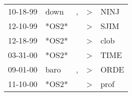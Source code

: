 \begin{supertabular}{p{0.07\textwidth}p{0.06\textwidth}p{0.02\textwidth}p{0.02\textwidth}p{0.06\textwidth}}
 10-18-99\textsuperscript{} &  down\textsuperscript{} &             , &  \textgreater &           NINJ\textsuperscript{} \\
 12-10-99\textsuperscript{} &                   *OS2* &               &  \textgreater &           SJIM\textsuperscript{} \\
 12-18-99\textsuperscript{} &                   *OS2* &               &  \textgreater &           clob\textsuperscript{} \\
 03-31-00\textsuperscript{} &                   *OS2* &               &  \textgreater &           TIME\textsuperscript{} \\
 09-01-00\textsuperscript{} &  baro\textsuperscript{} &             , &  \textgreater &           ORDE\textsuperscript{} \\
 11-10-00\textsuperscript{} &                   *OS2* &               &  \textgreater &           prof\textsuperscript{} \\
\end{supertabular}
